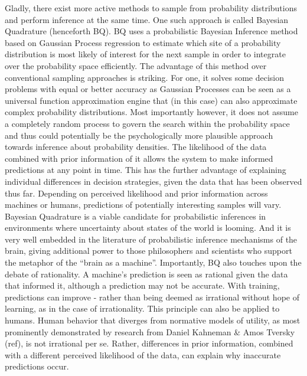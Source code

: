\documentclass[oneside, 11pt]{book}
\begin{document}
Gladly, there exist more active methods to sample from probability distributions and perform inference at the same time. One such approach is called Bayesian Quadrature (henceforth BQ). BQ uses a probabilistic Bayesian Inference method based on Gaussian Process regression to estimate which site of a probability distribution is most likely of interest for the next sample in order to integrate over the probability space efficiently. The advantage of this method over conventional sampling approaches is striking. For one, it solves some decision problems with equal or better accuracy as Gaussian Processes can be seen as a universal function approximation engine that (in this case) can also approximate complex probability distributions. Most importantly however, it does not assume a completely random process to govern the search within the probability space and thus could potentially be the psychologically more plausible approach towards inference about probability densities. The likelihood of the data combined with prior information of it allows the system to make informed predictions at any point in time. This has the further advantage of explaining individual differences in decision strategies, given the data that has been observed thus far. Depending on perceived likelihood and prior information across machines or humans, predictions of potentially interesting samples will vary. Bayesian Quadrature is a viable candidate for probabilistic inferences in environments where uncertainty about states of the world is looming. And it is very well embedded in the literature of probabilistic inference mechanisms of the brain, giving additional power to those philosophers and scientists who support the metaphor of the ``brain as a machine''. Importantly, BQ also touches upon the debate of rationality. A machine's prediction is seen as rational given the data that informed it, although a prediction may not be accurate. With training, predictions can improve - rather than being deemed as irrational without hope of learning, as in the case of irrationality. This principle can also be applied to humans. Human behavior that diverges from normative models of utility, as most prominently demonstrated by research from Daniel Kahneman \& Amos Tversky (ref), is not irrational per se. Rather, differences in prior information, combined with a different perceived likelihood of the data, can explain why inaccurate predictions occur.\\
\end{document}
